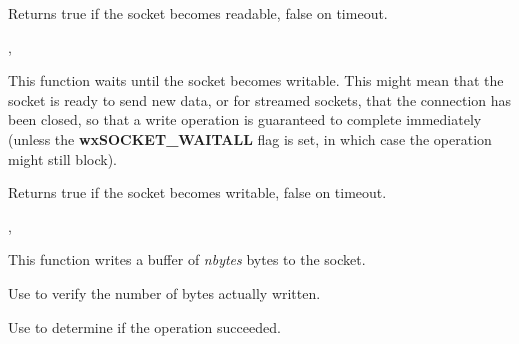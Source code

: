
Returns true if the socket becomes readable, false on timeout.


, 

%
%
\label{wxsocketbasewaitforwrite}


This function waits until the socket becomes writable. This might mean that
the socket is ready to send new data, or for streamed sockets, that the
connection has been closed, so that a write operation is guaranteed to
complete immediately (unless the {\bf wxSOCKET\_WAITALL} flag is set,
in which case the operation might still block).





Returns true if the socket becomes writable, false on timeout.


, 

%
%
\label{wxsocketbasewrite}


This function writes a buffer of {\it nbytes} bytes to the socket.

Use  to verify the number of bytes actually written.

Use  to determine if the operation succeeded.





